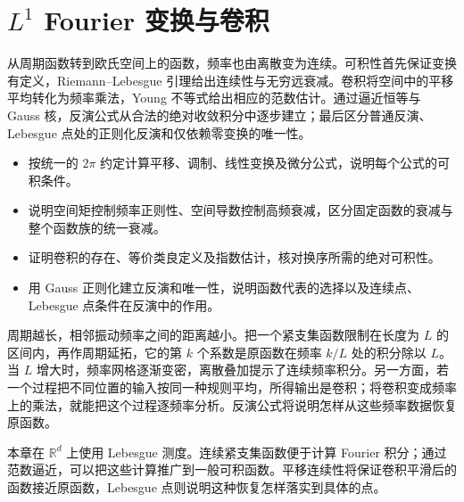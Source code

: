 \chapter{\texorpdfstring{\(L^1\)}{L¹} Fourier 变换与卷积}
\label{b2:ch:03}
\begin{chapterabstract}
从周期函数转到欧氏空间上的函数，频率也由离散变为连续。可积性首先保证变换有定义，Riemann--Lebesgue 引理给出连续性与无穷远衰减。卷积将空间中的平移平均转化为频率乘法，Young 不等式给出相应的范数估计。通过逼近恒等与 Gauss 核，反演公式从合法的绝对收敛积分中逐步建立；最后区分普通反演、Lebesgue 点处的正则化反演和仅依赖零变换的唯一性。
\end{chapterabstract}
\begin{learninggoals}
\begin{itemize}
\item\label{b2:item:03-goal-normalization}按统一的 \(2\pi\) 约定计算平移、调制、线性变换及微分公式，说明每个公式的可积条件。
\item\label{b2:item:03-goal-decay}说明空间矩控制频率正则性、空间导数控制高频衰减，区分固定函数的衰减与整个函数族的统一衰减。
\item\label{b2:item:03-goal-convolution}证明卷积的存在、等价类良定义及指数估计，核对换序所需的绝对可积性。
\item\label{b2:item:03-goal-inversion}用 Gauss 正则化建立反演和唯一性，说明函数代表的选择以及连续点、Lebesgue 点条件在反演中的作用。
\end{itemize}
\end{learninggoals}

周期越长，相邻振动频率之间的距离越小。把一个紧支集函数限制在长度为 \(L\) 的区间内，再作周期延拓，它的第 \(k\) 个系数是原函数在频率 \(k/L\) 处的积分除以 \(L\)。当 \(L\) 增大时，频率网格逐渐变密，离散叠加提示了连续频率积分。另一方面，若一个过程把不同位置的输入按同一种规则平均，所得输出是卷积；将卷积变成频率上的乘法，就能把这个过程逐频率分析。反演公式将说明怎样从这些频率数据恢复原函数。

\ProseParagraphBreak

本章在 \(\mathbb R^d\) 上使用 Lebesgue 测度。连续紧支集函数便于计算 Fourier 积分；通过范数逼近，可以把这些计算推广到一般可积函数。平移连续性将保证卷积平滑后的函数接近原函数，Lebesgue 点则说明这种恢复怎样落实到具体的点。

\ProseParagraphBreak

